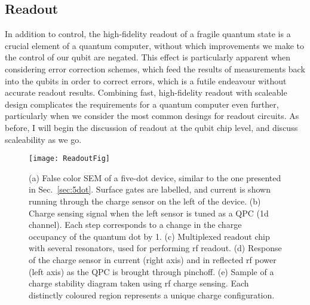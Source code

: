 \subsection{Readout}
\label{sec:readout}
In addition to control, the high-fidelity readout of a fragile quantum state is a crucial element of a quantum computer, without which improvements
we make to the control of our qubit are negated. This effect is particularly apparent when considering error correction schemes, which feed the results
of measurements back into the qubits in order to correct errors, which is a futile endeavour without accurate readout results. Combining fast,
high-fidelity readout with scaleable design complicates the requirements for a quantum computer even further, particularly when we consider
the most common desings for readout circuits. As before, I will begin the discussion of readout at the qubit chip level, and discuss scaleability as we go.

\begin{figure}
  \texttt{[image: ReadoutFig]}
  \caption[Readout of a semiconductor quantum dot]
  {\label{fig:readout}(a) False color SEM of a five-dot device, similar to the one presented in Sec.~\ref{sec:5dot}. Surface gates are labelled, and
  current is shown running through the charge sensor on the left of the device. (b) Charge sensing signal when the left sensor is tuned as a QPC (1d channel).
  Each step corresponds to a change in the charge occupancy of the quantum dot by 1. (c) Multiplexed readout chip with several resonators, used for
  performing rf readout. (d) Response of the charge sensor in current (right axis) and in reflected rf power (left axis) as the QPC is brought through pinchoff.
  (e) Sample of a charge stability diagram taken using rf charge sensing. Each distinctly coloured region represents a unique charge configuration.}
\end{figure}

